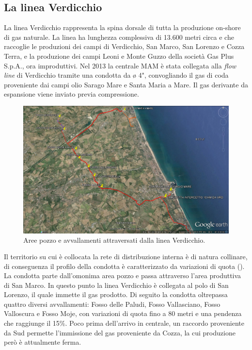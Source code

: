 \subsection{La linea Verdicchio}
La linea Verdicchio rappresenta la spina dorsale di tutta la produzione on-shore di gas naturale. La linea ha lunghezza complessiva di 13.600 metri circa e che raccoglie le produzioni dei campi di Verdicchio, San Marco, San Lorenzo e Cozza Terra, e la produzione dei campi Leoni e Monte Guzzo della società Gas Plus S.p.A., ora improduttivi.  Nel 2013 la centrale MAM è stata collegata alla \textit{flow line} di Verdicchio tramite una condotta da ø 4", convogliando il gas di coda proveniente dai campi olio Sarago Mare e Santa Maria a Mare. Il gas derivante da espansione viene inviato previa compressione.\\
\begin{figure}[htbp]
	\centering
	\includegraphics[width=\textwidth]{fig/test/linea-verdicchio}
	\caption{Aree pozzo e avvallamenti attraversati dalla linea Verdicchio.}
	\label{fig:lineavrd}
\end{figure}
Il territorio su cui è collocata la rete di distribuzione interna è di natura collinare, di conseguenza il profilo della condotta è caratterizzato da variazioni di quota (). La condotta parte dall'omonima area pozzo e passa attraverso l'area produttiva di San Marco. In questo punto la linea Verdicchio è collegata al polo di San Lorenzo, il quale immette il gas prodotto. Di seguito la condotta oltrepassa quattro diversi avvallamenti: Fosso delle Paludi, Fosso Vallasciano, Fosso Valloscura e Fosso Moje, con variazioni di quota fino a 80 metri e una pendenza che raggiunge il 15\%. Poco prima dell'arrivo in centrale, un raccordo proveniente da Sud permette l'immissione del gas proveniente da Cozza, la cui produzione però è attualmente ferma.\\

